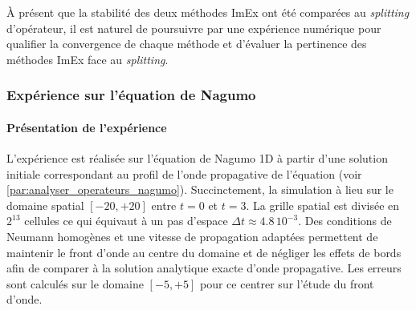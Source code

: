 À présent que la stabilité des deux méthodes ImEx ont été comparées au \textit{splitting} d'opérateur, 
il est naturel de poursuivre par une expérience numérique pour qualifier la convergence de chaque méthode et 
d'évaluer la pertinence des méthodes ImEx face au \textit{splitting}.
\subsubsection{Expérience sur l'équation de Nagumo}
    \paragraph{Présentation de l'expérience}
    L'expérience est réalisée sur l'équation de Nagumo 1D à partir d'une solution initiale correspondant au profil de l'onde propagative de l'équation (voir \ref{par:analyser_operateurs_nagumo}).
    Succinctement, la simulation à lieu sur le domaine spatial $[-20,+20]$ entre $t=0$ et $t=3$.
    La grille spatial est divisée en $2^{13}$ cellules ce qui équivaut à un pas d'espace $\Delta t \approx 4.8 \, 10^{-3}$.
    Des conditions de Neumann homogènes et une vitesse de propagation adaptées permettent de maintenir le front d'onde au centre du domaine et 
    de négliger les effets de bords afin de comparer à la solution analytique exacte d'onde propagative. Les erreurs sont calculés sur le domaine $[-5,+5]$ pour ce centrer sur l'étude du front d'onde.

